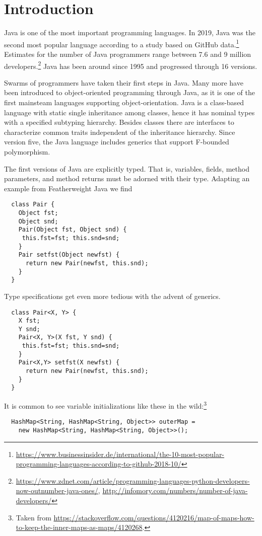 \section{Introduction}
\label{sec:introduction}

Java is one of the most important programming languages. In 2019, Java
was the second most popular language according to a study
based on GitHub
data.\footnote{\url{https://www.businessinsider.de/international/the-10-most-popular-programming-languages-according-to-github-2018-10/}} Estimates
for the number of Java programmers range between 7.6 and 9 million
developers.\footnote{\url{https://www.zdnet.com/article/programming-languages-python-developers-now-outnumber-java-ones/},
\url{http://infomory.com/numbers/number-of-java-developers/}} Java
has been around since 1995 and progressed through 16 versions.

Swarms of programmers have taken their first steps in Java. Many more
have been introduced to object-oriented programming through Java, as
it is one of the first mainsteam languages supporting
object-orientation. Java is a class-based language with static single inheritance among
classes, hence it has nominal types with a specified subtyping
hierarchy. Besides classes there are interfaces to characterize common 
traits independent of the inheritance hierarchy. Since version five,
the Java language includes generics that support F-bounded
polymorphism.

The first versions of Java are explicitly typed. That is, 
variables, fields, method parameters, and method returns must be
adorned with their type. Adapting an example from Featherweight Java
\cite{DBLP:journals/toplas/IgarashiPW01} we find
\begin{lstlisting}
  class Pair {
    Object fst;
    Object snd;
    Pair(Object fst, Object snd) {
     this.fst=fst; this.snd=snd;
    }
    Pair setfst(Object newfst) {
      return new Pair(newfst, this.snd);
    }
  }
\end{lstlisting}
Type specifications get even more tedious
with the advent of generics.
\begin{lstlisting}
  class Pair<X, Y> {
    X fst;
    Y snd;
    Pair<X, Y>(X fst, Y snd) {
     this.fst=fst; this.snd=snd;
    }
    Pair<X,Y> setfst(X newfst) {
      return new Pair(newfst, this.snd);
    }
  }  
\end{lstlisting}
It is common to see variable initializations like
these in the wild:\footnote{Taken from
  \url{https://stackoverflow.com/questions/4120216/map-of-maps-how-to-keep-the-inner-maps-as-maps/4120268}.} 
\begin{lstlisting}
  HashMap<String, HashMap<String, Object>> outerMap =
    new HashMap<String, HashMap<String, Object>>();
\end{lstlisting}


